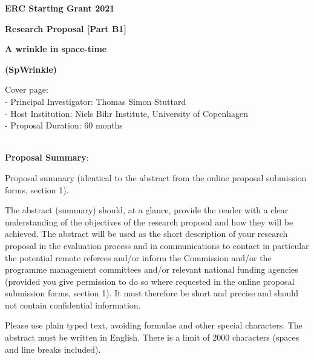 \documentclass[a4paper,11pt]{article}
\renewcommand{\smallskip} {\vspace{0.1in}}
\begin{document}
\renewcommand{\headrulewidth}{0pt}



\vspace{1cm}

\centerline{ \large \textbf{ERC Starting Grant 2021}} \smallskip
\centerline{ \large \textbf {Research Proposal [Part B1]}} \smallskip

\vspace{1.0cm}

%
\centerline{\huge \textbf{A wrinkle in space-time}}
\vspace{0.5cm}
\centerline{ \huge {\bf (SpWrinkle)}} 



\vspace{1.5cm}

\noindent
Cover page: \\
- Principal Investigator: Thomas Simon Stuttard\\
- Host Institution: Niels Bihr Institute, University of Copenhagen\\
- Proposal Duration: $60$ months\\

~\vspace{0. cm}

\noindent
{\bf Proposal Summary}:

Proposal summary (identical to the abstract from the online proposal submission forms, section 1). 

The abstract (summary) should, at a glance, provide the reader with a clear understanding of the objectives of the research proposal and how they will be achieved. The abstract will be used as the short description of your research proposal in the evaluation process and in communications to contact in particular the potential remote referees and/or inform the Commission and/or the programme management committees and/or relevant national funding agencies (provided you give permission to do so where requested in the online proposal submission forms, section 1). It must therefore be short and precise and should not contain confidential information. 

Please use plain typed text, avoiding formulae and other special characters. The abstract must be written in English. There is a limit of 2000 characters (spaces and line breaks included).
\end{document}
